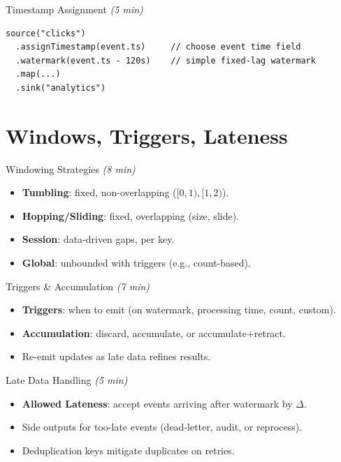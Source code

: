 \documentclass[aspectratio=169,11pt]{beamer}
\newcommand{\term}[1]{\textbf{#1}}
\newcommand{\mins}[1]{\textit{(#1 min)}}
\begin{document}
\begin{frame}[fragile]{Timestamp Assignment \mins{5}}
\begin{lstlisting}
source("clicks")
  .assignTimestamp(event.ts)     // choose event time field
  .watermark(event.ts - 120s)    // simple fixed-lag watermark
  .map(...)
  .sink("analytics")
\end{lstlisting}
\end{frame}

\section{Windows, Triggers, Lateness}
\begin{frame}{Windowing Strategies \mins{8}}
  \begin{itemize}
    \item \term{Tumbling}: fixed, non-overlapping ($[0,1),[1,2)$).
    \item \term{Hopping/Sliding}: fixed, overlapping (size, slide).
    \item \term{Session}: data-driven gaps, per key.
    \item \term{Global}: unbounded with triggers (e.g., count-based).
  \end{itemize}
\end{frame}

\begin{frame}{Triggers \& Accumulation \mins{7}}
  \begin{itemize}
    \item \term{Triggers}: when to emit (on watermark, processing time, count, custom).
    \item \term{Accumulation}: discard, accumulate, or accumulate+retract.
    \item Re-emit updates as late data refines results.
  \end{itemize}
\end{frame}

\begin{frame}{Late Data Handling \mins{5}}
  \begin{itemize}
    \item \term{Allowed Lateness}: accept events arriving after watermark by $\Delta$.
    \item Side outputs for too-late events (dead-letter, audit, or reprocess).
    \item Deduplication keys mitigate duplicates on retries.
  \end{itemize}
\end{frame}
\end{document}
